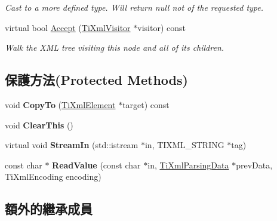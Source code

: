 \begin{DoxyCompactItemize}
\begin{DoxyCompactList}\small\item\em Cast to a more defined type. Will return null not of the requested type. \end{DoxyCompactList}\item 
virtual bool \hyperlink{class_ti_xml_element_a31ab28cc3b892a69254391d6bbe08df3}{Accept} (\hyperlink{class_ti_xml_visitor}{Ti\+Xml\+Visitor} $\ast$visitor) const \hypertarget{class_ti_xml_element_a31ab28cc3b892a69254391d6bbe08df3}{}\label{class_ti_xml_element_a31ab28cc3b892a69254391d6bbe08df3}

\begin{DoxyCompactList}\small\item\em Walk the X\+ML tree visiting this node and all of its children. \end{DoxyCompactList}\end{DoxyCompactItemize}
\subsection*{保護方法(Protected Methods)}
\begin{DoxyCompactItemize}
\item 
void {\bfseries Copy\+To} (\hyperlink{class_ti_xml_element}{Ti\+Xml\+Element} $\ast$target) const \hypertarget{class_ti_xml_element_a9e0c1983b840de4134f1f6bf7af00b0f}{}\label{class_ti_xml_element_a9e0c1983b840de4134f1f6bf7af00b0f}

\item 
void {\bfseries Clear\+This} ()\hypertarget{class_ti_xml_element_a5670933ec2d7d9763b9891acc05d7f7d}{}\label{class_ti_xml_element_a5670933ec2d7d9763b9891acc05d7f7d}

\item 
virtual void {\bfseries Stream\+In} (std\+::istream $\ast$in, T\+I\+X\+M\+L\+\_\+\+S\+T\+R\+I\+NG $\ast$tag)\hypertarget{class_ti_xml_element_a6884b491fb4708dae566f3ddc1476536}{}\label{class_ti_xml_element_a6884b491fb4708dae566f3ddc1476536}

\item 
const char $\ast$ {\bfseries Read\+Value} (const char $\ast$in, \hyperlink{class_ti_xml_parsing_data}{Ti\+Xml\+Parsing\+Data} $\ast$prev\+Data, Ti\+Xml\+Encoding encoding)\hypertarget{class_ti_xml_element_ac786bce103042d3837c4cc2ff6967d41}{}\label{class_ti_xml_element_ac786bce103042d3837c4cc2ff6967d41}

\end{DoxyCompactItemize}
\subsection*{額外的繼承成員}


